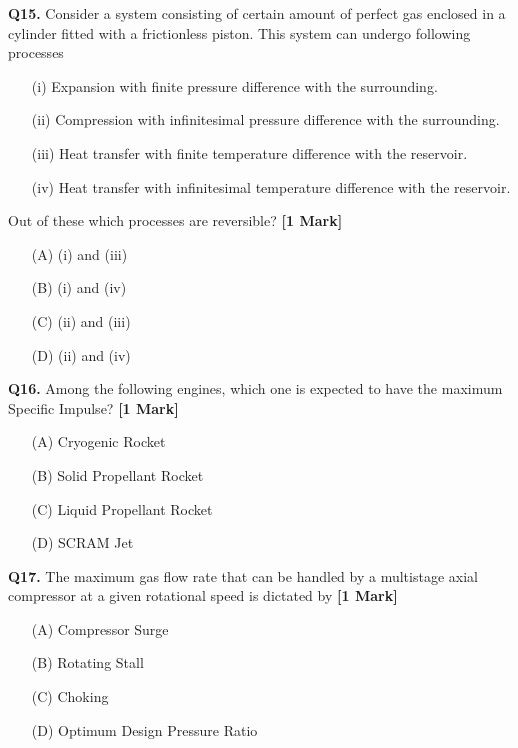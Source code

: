 \documentclass[11pt]{article}
\newcommand{\questiona}[2]{
    \noindent\textbf{Q#2.} #1 \hfill \textbf{[1 Mark]}
}
\begin{document}
\questiona{Consider a system consisting of certain amount of perfect gas enclosed in a cylinder fitted with a frictionless piston. This system can undergo following processes  
\begin{enumerate}
\item[(i)] Expansion with finite pressure difference with the surrounding.  
\item[(ii)] Compression with infinitesimal pressure difference with the surrounding.  
\item[(iii)] Heat transfer with finite temperature difference with the reservoir.  
\item[(iv)] Heat transfer with infinitesimal temperature difference with the reservoir.
\end{enumerate}

Out of these which processes are reversible?}{15}
\begin{enumerate}
    \item[(A)] (i) and (iii)  
    \item[(B)] (i) and (iv)  
    \item[(C)] (ii) and (iii)  
    \item[(D)] (ii) and (iv)
\end{enumerate}

\vspace{0.5cm}

\questiona{Among the following engines, which one is expected to have the maximum Specific Impulse?}{16}
\begin{enumerate}
    \item[(A)] Cryogenic Rocket
    \item[(B)] Solid Propellant Rocket
    \item[(C)] Liquid Propellant Rocket
    \item[(D)] SCRAM Jet
\end{enumerate}

\vspace{0.5cm}

\questiona{The maximum gas flow rate that can be handled by a multistage axial compressor at a given rotational speed is dictated by}{17}
\begin{enumerate}
    \item[(A)] Compressor Surge
    \item[(B)] Rotating Stall
    \item[(C)] Choking
    \item[(D)] Optimum Design Pressure Ratio
\end{enumerate}
\end{document}
